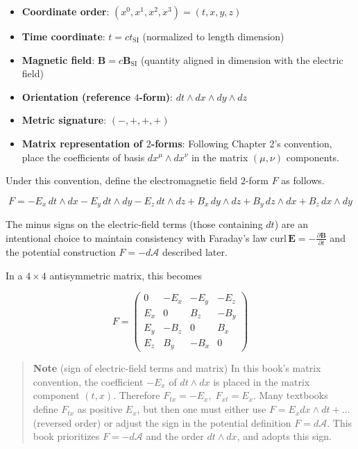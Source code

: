 \begin{itemize}
\item
  \textbf{Coordinate order}: \((x^0, x^1, x^2, x^3) = (t, x, y, z)\)
\item
  \textbf{Time coordinate}: \(t = ct_{\text{SI}}\) (normalized to length
  dimension)
\item
  \textbf{Magnetic field}: \(\mathbf{B} = c\mathbf{B}_{\text{SI}}\)
  (quantity aligned in dimension with the electric field)
\item
  \textbf{Orientation (reference $4$-form)}:
  \(dt \wedge dx \wedge dy \wedge dz\)
\item
  \textbf{Metric signature}: \((-, +, +, +)\)
\item
  \textbf{Matrix representation of $2$-forms}: Following Chapter 2's
  convention, place the coefficients of basis \(dx^\mu \wedge dx^\nu\)
  in the matrix \((\mu, \nu)\) components.
\end{itemize}

Under this convention, define the electromagnetic field \(2\)-form \(F\)
as follows.

\[
F = -E_x\,dt\wedge dx - E_y\,dt\wedge dy - E_z\,dt\wedge dz + B_x\,dy\wedge dz + B_y\,dz\wedge dx + B_z\,dx\wedge dy
\]

The minus signs on the electric-field terms (those containing \(dt\))
are an intentional choice to maintain consistency with Faraday's law
\(\mathrm{curl}\,\mathbf{E} = -\frac{\partial\mathbf{B}}{\partial t}\)
and the potential construction \(F = -d\mathcal{A}\) described later.

In a \(4\times4\) antisymmetric matrix, this becomes

\[F = \begin{pmatrix}
0 & -E_x & -E_y & -E_z \\
E_x & 0 & B_z & -B_y \\
E_y & -B_z & 0 & B_x \\
E_z & B_y & -B_x & 0
\end{pmatrix}\]

\begin{quote}
\textbf{Note} (sign of electric-field terms and matrix) In this book's
matrix convention, the coefficient \(-E_x\) of \(dt \wedge dx\) is
placed in the matrix component \((t,x)\). Therefore
\(F_{tx}=-E_x,\;F_{xt}=E_x\). Many textbooks define \(F_{t x}\) as
positive \(E_x\), but then one must either use
\(F = E_x dx \wedge dt + \dots\) (reversed order) or adjust the sign in
the potential definition \(F=d\mathcal{A}\). This book prioritizes
\(F=-d\mathcal{A}\) and the order \(dt \wedge dx\), and adopts this
sign.
\end{quote}

